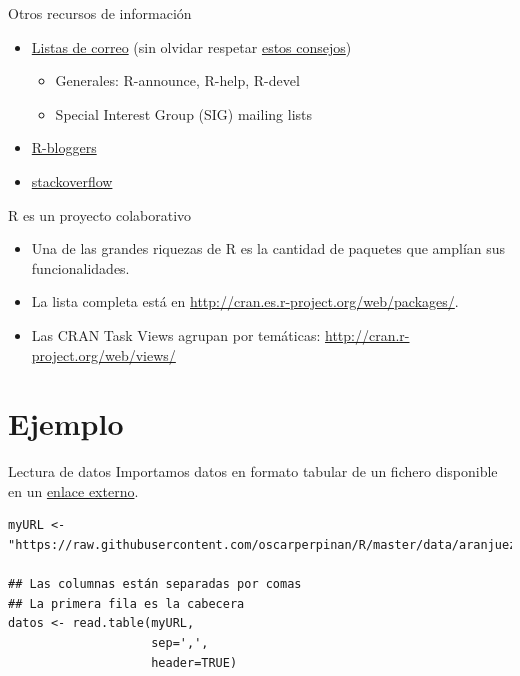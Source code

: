\documentclass[aspectratio=169, usenames,svgnames,dvipsnames]{beamer}
\begin{document}
\begin{frame}[label={sec:org423b2ae}]{Otros recursos de información}
\begin{itemize}
\item \href{http://www.r-project.org/mail.html}{Listas de correo} (sin olvidar respetar \href{http://www.r-project.org/posting-guide.html}{estos consejos})
\begin{itemize}
\item Generales: R-announce, R-help, R-devel
\item Special Interest Group (SIG) mailing lists
\end{itemize}
\item \href{http://www.r-bloggers.com}{R-bloggers}
\item \href{http://stackoverflow.com/questions/tagged/r}{stackoverflow}
\end{itemize}
\end{frame}

\begin{frame}[label={sec:org462396d}]{R es un proyecto colaborativo}
\begin{itemize}
\item Una de las grandes riquezas de R es la cantidad de paquetes que amplían sus funcionalidades.
\item La lista completa está en \url{http://cran.es.r-project.org/web/packages/}.
\item Las CRAN Task Views agrupan por temáticas:
\url{http://cran.r-project.org/web/views/}
\end{itemize}
\end{frame}


\section{Ejemplo}
\label{sec:org34fceea}

\begin{frame}[label={sec:org499fab6},fragile]{Lectura de datos}
 Importamos datos en formato tabular de un fichero disponible en un \href{https://raw.githubusercontent.com/oscarperpinan/R/master/data/aranjuez.csv}{enlace externo}. 
\lstset{language=r,label= ,caption= ,captionpos=b,numbers=none}
\begin{lstlisting}
myURL <- "https://raw.githubusercontent.com/oscarperpinan/R/master/data/aranjuez.csv"

## Las columnas están separadas por comas
## La primera fila es la cabecera
datos <- read.table(myURL,
                    sep=',',
                    header=TRUE)
\end{lstlisting}
\end{frame}
\end{document}

